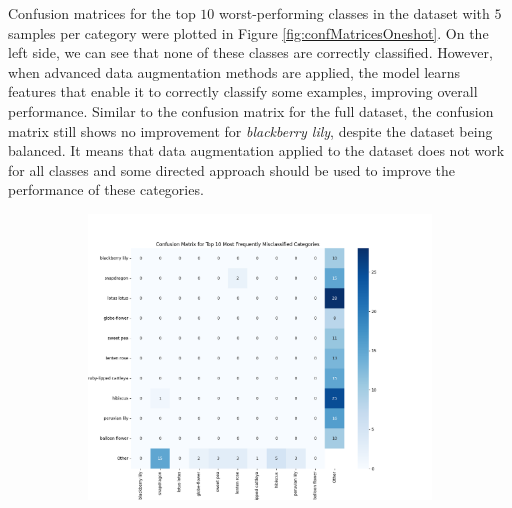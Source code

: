 Confusion matrices for the top $10$ worst-performing classes in the dataset with $5$ samples per category were plotted in Figure \ref{fig:confMatricesOneshot}. On the left side, we can see that none of these classes are correctly classified. However, when advanced data augmentation methods are applied, the model learns features that enable it to correctly classify some examples, improving overall performance. Similar to the confusion matrix for the full dataset, the confusion matrix still shows no improvement for \textit{blackberry lily}, despite the dataset being balanced. It means that data augmentation applied to the dataset does not work for all classes and some directed approach should be used to improve the performance of these categories.

\begin{figure}[!htb]
    \centering
    \begin{subfigure}[b]{0.49\textwidth}
        \centering
        \includegraphics[width=\textwidth]{Images/oneshot/cm/no_aug_cm.png}
    \end{subfigure}
    \begin{subfigure}[b]{0.49\textwidth}
        \centering

\end{subfigure}
\end{figure}
